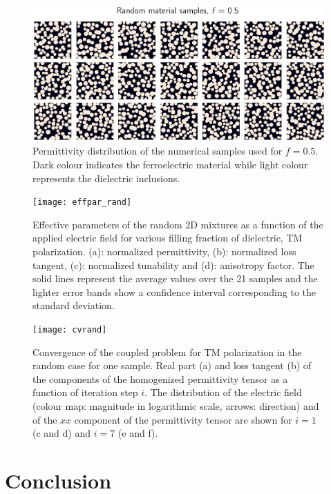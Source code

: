 \documentclass[%
 reprint,
 amsmath,amssymb,
 aps,
]{revtex4-2}
\begin{document}
\begin{figure}
\centering
\includegraphics[width=1\columnwidth]{randmatepsi}
\caption{Permittivity distribution of the numerical samples used for $f=0.5$. Dark
colour indicates the ferroelectric material while light colour represents the
dielectric inclusions.}
\label{randmatepsi}
\end{figure}


\begin{figure}[!t]
\centering
\texttt{[image: effpar\_rand]}
\caption{Effective parameters of the random 2D mixtures as a function of the
 applied electric field for various filling fraction of dielectric, TM polarization.
 (a): normalized permittivity, (b): normalized loss tangent, (c): normalized tunability and
 (d): anisotropy factor. The solid lines represent the average values
  over the 21 samples and the lighter error bands show a confidence interval corresponding to
  the standard deviation.}
\label{eff_par_2Drand_TM}
\end{figure}



\begin{figure}[!t]
\centering
\texttt{[image: cvrand]}
\caption{Convergence of the coupled problem for TM polarization in the random case
for one sample.
Real part (a) and loss tangent (b) of the components of the homogenized
 permittivity tensor as a function of iteration step $i$. The distribution of
 the electric field (colour map: magnitude in logarithmic scale, arrows: direction) and of the
 $xx$ component of the permittivity tensor are shown for $i=1$
  (c and d) and $i=7$ (e and f).
 }
\label{conv_random}
\end{figure}




\section*{Conclusion}
\end{document}
